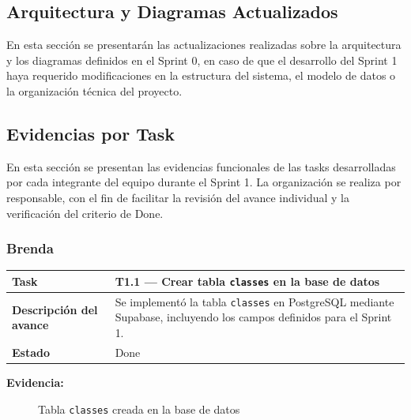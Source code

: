 \documentclass[12pt,a4paper]{article}
\renewcommand{\arraystretch}{1.45}
\begin{document}
\subsection{Arquitectura y Diagramas Actualizados}

En esta sección se presentarán las actualizaciones realizadas sobre la
arquitectura y los diagramas definidos en el Sprint 0, en caso de que el
desarrollo del Sprint 1 haya requerido modificaciones en la estructura del
sistema, el modelo de datos o la organización técnica del proyecto.

\subsection{Evidencias por Task}

En esta sección se presentan las evidencias funcionales de las tasks
desarrolladas por cada integrante del equipo durante el Sprint 1. La
organización se realiza por responsable, con el fin de facilitar la revisión
del avance individual y la verificación del criterio de Done.

\subsubsection*{Brenda}

\begin{table}[H]
\centering
\renewcommand{\arraystretch}{1.2}
\begin{tabular}{|p{3cm}|p{10cm}|}
\hline
\textbf{Task} & T1.1 --- Crear tabla \texttt{classes} en la base de datos \\
\hline
\textbf{Descripción del avance} & Se implementó la tabla \texttt{classes} en PostgreSQL mediante Supabase, incluyendo los campos definidos para el Sprint 1. \\
\hline
\textbf{Estado} & Done \\
\hline
\end{tabular}
\end{table}

\textbf{Evidencia:}
\begin{figure}[H]
    \centering
    \caption{Tabla \texttt{classes} creada en la base de datos}
\end{figure}
\end{document}
